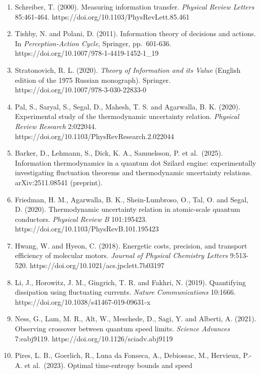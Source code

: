\documentclass[
  10pt,
]{article}
\begin{document}
\begin{enumerate}
  Trade-offs between cost and information in cellular prediction.
  \emph{Proceedings of the National Academy of Sciences}
  120:e2303078120. https://doi.org/10.1073/pnas.2303078120
\item
  Schreiber, T. (2000). Measuring information transfer. \emph{Physical
  Review Letters} 85:461-464. https://doi.org/10.1103/PhysRevLett.85.461
\item
  Tishby, N. and Polani, D. (2011). Information theory of decisions and
  actions. In \emph{Perception-Action Cycle}, Springer, pp.~601-636.
  https://doi.org/10.1007/978-1-4419-1452-1\_19
\item
  Stratonovich, R. L. (2020). \emph{Theory of Information and its Value}
  (English edition of the 1975 Russian monograph). Springer.
  https://doi.org/10.1007/978-3-030-22833-0
\item
  Pal, S., Saryal, S., Segal, D., Mahesh, T. S. and Agarwalla, B. K.
  (2020). Experimental study of the thermodynamic uncertainty relation.
  \emph{Physical Review Research} 2:022044.
  https://doi.org/10.1103/PhysRevResearch.2.022044
\item
  Barker, D., Lehmann, S., Dick, K. A., Samuelsson, P. et al.~(2025).
  Information thermodynamics in a quantum dot Szilard engine:
  experimentally investigating fluctuation theorems and thermodynamic
  uncertainty relations. arXiv:2511.08541 (preprint).
\item
  Friedman, H. M., Agarwalla, B. K., Shein-Lumbroso, O., Tal, O. and
  Segal, D. (2020). Thermodynamic uncertainty relation in atomic-scale
  quantum conductors. \emph{Physical Review B} 101:195423.
  https://doi.org/10.1103/PhysRevB.101.195423
\item
  Hwang, W. and Hyeon, C. (2018). Energetic costs, precision, and
  transport efficiency of molecular motors. \emph{Journal of Physical
  Chemistry Letters} 9:513-520.
  https://doi.org/10.1021/acs.jpclett.7b03197
\item
  Li, J., Horowitz, J. M., Gingrich, T. R. and Fakhri, N. (2019).
  Quantifying dissipation using fluctuating currents. \emph{Nature
  Communications} 10:1666. https://doi.org/10.1038/s41467-019-09631-x
\item
  Ness, G., Lam, M. R., Alt, W., Meschede, D., Sagi, Y. and Alberti, A.
  (2021). Observing crossover between quantum speed limits.
  \emph{Science Advances} 7:eabj9119.
  https://doi.org/10.1126/sciadv.abj9119
\item
  Pires, L. B., Goerlich, R., Luna da Fonseca, A., Debiossac, M.,
  Hervieux, P.-A. et al.~(2023). Optimal time-entropy bounds and speed

\end{enumerate}
\end{document}

